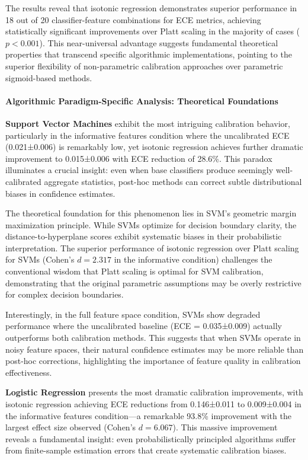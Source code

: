 \documentclass[12pt, a4paper]{article}
\begin{document}
The results reveal that isotonic regression demonstrates superior performance in 18 out of 20 classifier-feature combinations for ECE metrics, achieving statistically significant improvements over Platt scaling in the majority of cases ($p < 0.001$). This near-universal advantage suggests fundamental theoretical properties that transcend specific algorithmic implementations, pointing to the superior flexibility of non-parametric calibration approaches over parametric sigmoid-based methods.

\paragraph{Algorithmic Paradigm-Specific Analysis: Theoretical Foundations}

\textbf{Support Vector Machines} exhibit the most intriguing calibration behavior, particularly in the informative features condition where the uncalibrated ECE (0.021±0.006) is remarkably low, yet isotonic regression achieves further dramatic improvement to 0.015±0.006 with ECE reduction of 28.6\%. This paradox illuminates a crucial insight: even when base classifiers produce seemingly well-calibrated aggregate statistics, post-hoc methods can correct subtle distributional biases in confidence estimates.

The theoretical foundation for this phenomenon lies in SVM's geometric margin maximization principle. While SVMs optimize for decision boundary clarity, the distance-to-hyperplane scores exhibit systematic biases in their probabilistic interpretation. The superior performance of isotonic regression over Platt scaling for SVMs (Cohen's $d = 2.317$ in the informative condition) challenges the conventional wisdom that Platt scaling is optimal for SVM calibration, demonstrating that the original parametric assumptions may be overly restrictive for complex decision boundaries.

Interestingly, in the full feature space condition, SVMs show degraded performance where the uncalibrated baseline (ECE = 0.035±0.009) actually outperforms both calibration methods. This suggests that when SVMs operate in noisy feature spaces, their natural confidence estimates may be more reliable than post-hoc corrections, highlighting the importance of feature quality in calibration effectiveness.

\textbf{Logistic Regression} presents the most dramatic calibration improvements, with isotonic regression achieving ECE reductions from 0.146±0.011 to 0.009±0.004 in the informative features condition—a remarkable 93.8\% improvement with the largest effect size observed (Cohen's $d = 6.067$). This massive improvement reveals a fundamental insight: even probabilistically principled algorithms suffer from finite-sample estimation errors that create systematic calibration biases.
\end{document}
